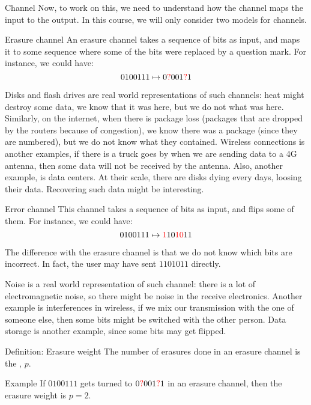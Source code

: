 \documentclass[a4paper]{article}
\begin{document}
\begin{parag}{Channel}
    Now, to work on this, we need to understand how the channel maps the input to the output. In this course, we will only consider two models for channels.

    \begin{subparag}{Erasure channel}
        An erasure channel takes a sequence of bits as input, and maps it to some sequence where some of the bits were replaced by a question mark. For instance, we could have: 
        \[0100111 \mapsto 0{\color{red}?}001{\color{red}?}1\]
        
        Disks and flash drives are real world representations of such channels: heat might destroy some data, we know that it was here, but we do not what was here. Similarly, on the internet, when there is package loss (packages that are dropped by the routers because of congestion), we know there was a package (since they are numbered), but we do not know what they contained. Wireless connections is another examples, if there is a truck goes by when we are sending data to a 4G antenna, then some data will not be received by the antenna. Also, another example, is data centers. At their scale, there are disks dying every days, loosing their data. Recovering such data might be interesting.
    \end{subparag}
    
    \begin{subparag}{Error channel}
        This channel takes a sequence of bits as input, and flips some of them. For instance, we could have: 
        \[0100111 \mapsto {\color{red}1}10{\color{red}10}11\]
        
        The difference with the erasure channel is that we do not know which bits are incorrect. In fact, the user may have sent $1101011$ directly.

        Noise is a real world representation of such channel: there is a lot of electromagnetic noise, so there might be noise in the receive electronics. Another example is interferences in wireless, if we mix our transmission with the one of someone else, then some bits might be switched with the other person. Data storage is another example, since some bits may get flipped.
    \end{subparag}
    
\end{parag}

\begin{parag}{Definition: Erasure weight}
    The number of erasures done in an erasure channel is the , $p$. 

    \begin{subparag}{Example}
        If $0100111$ gets turned to $0{\color{red}?}001{\color{red}?}1$ in an erasure channel, then the erasure weight is $p = 2$.
    \end{subparag}
\end{parag}
\end{document}
